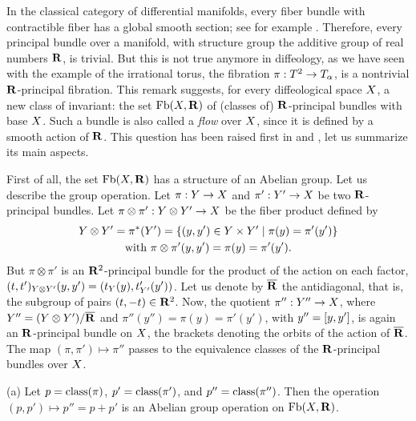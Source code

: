 \begin{article}
  \label{R-bundles-over-irrational-tori-and-small-divisors}
  In the classical category of differential manifolds,
  every fiber bundle with contractible fiber has a global smooth section;
  see for example \cite{Die70c}.
  Therefore,
  every principal bundle over a manifold,
  with structure group the additive group of real numbers ${\mathbf R}$, is trivial.
  But this is not true anymore in diffeology,
  as we have seen with the example of the irrational torus,
  the fibration $\pi : T^2 \to T_\alpha$,
  is a nontrivial ${\mathbf R}$-principal fibration.
  This remark suggests,
  for every diffeological space $X$,
  a new class of invariant:
  the set $\operatorname{Fb}(X,{\mathbf R})$ of (classes of) ${\mathbf R}$-principal bundles with base $X$.
  Such a bundle is also called a {\em flow} over $X$,
  since it is defined by a smooth action of ${\mathbf R}$.
  This question has been raised first in \cite{Igl85} and \cite{Igl86},
  let us summarize its main aspects.
  
  First of all,
  the set $\operatorname{Fb}(X,{\mathbf R})$ has a structure of an Abelian group.
  Let us describe the group operation.
  Let $\pi : Y \to X$ and $\pi' : Y' \to X$ be two ${\mathbf R}$-principal bundles.
  Let $\pi \otimes \pi' : Y \otimes Y' \to X$ be the fiber product defined by
  \begin{multline*}
    Y \otimes Y' = \pi^*(Y') = \{ (y,y') \in Y \times Y' \mid \pi(y) = \pi'(y') \} \\
    \text{with }
    \pi \otimes \pi'(y,y') = \pi(y) = \pi'(y').
  \end{multline*}
  But $\pi \otimes \pi'$ is an ${\mathbf R}^2$-principal bundle for the product of the action on each factor,
  $(t,t')_{Y \otimes Y'}(y,y') = (t_Y(y), t'_{Y'}(y'))$.
  Let us denote by $\overline {{\mathbf R}}$ the antidiagonal,
  that is, the subgroup of pairs $(t,-t) \in {\mathbf R}^2$.
  Now,
  the quotient $\pi'' : Y'' \to X$,
  where $Y'' = (Y \otimes Y')/\overline {{\mathbf R}}$ and $\pi''(y'') = \pi(y) = \pi'(y')$,
  with $y'' = \left[ y,y' \right]$,
  is again an ${\mathbf R}$-principal bundle on $X$,
  the brackets denoting the orbits of the action of $\overline {{\mathbf R}}$.
  The map $(\pi,\pi') \mapsto \pi''$ passes to the equivalence classes of the ${\mathbf R}$-principal bundles over $X$.
  
  (a) Let $p = \operatorname{class}(\pi)$,
  $p' = \operatorname{class}(\pi')$,
  and $p'' = \operatorname{class}(\pi'')$.
  Then the operation $(p,p') \mapsto p'' = p + p'$ is an Abelian group operation on $\operatorname{Fb}(X,{\mathbf R})$.
  

\end{article}
